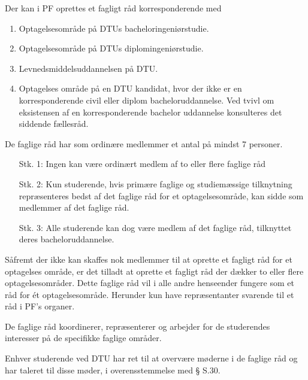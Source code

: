 \begin{list}
\item \label{L4:hvem} Der kan i PF oprettes et fagligt råd korresponderende med
	\begin{enumerate}
	\item Optagelsesområde på DTUs bacheloringeniørstudie.
	\item Optagelsesområde på DTUs diplomingeniørstudie.
	\item Levnedsmiddelsuddannelsen på DTU.
	\item Optagelses område på en DTU kandidat, hvor der ikke er en korresponderende civil eller diplom bacheloruddannelse. Ved tvivl om eksistensen af en korresponderende bachelor uddannelse konsulteres det siddende fællesråd.
	\end{enumerate}     
    
\item \label{L4:ordinaere} De faglige råd har som ordinære medlemmer et antal på mindst 7 personer.
\begin{itemize}%
	\item[Stk. 1:] \label{L4:ordinaere1} Ingen kan være ordinært medlem af to eller flere faglige råd
	
	\item[Stk. 2:] Kun studerende, hvis primære faglige og studiemæssige tilknytning repræsenteres bedst af det faglige råd for et optagelsesområde, kan sidde som medlemmer af det faglige råd.
	
	\item[Stk. 3:] Alle studerende kan dog være medlem af det faglige råd, tilknyttet deres bacheloruddannelse.

\end{itemize}

\item \label{L4:flereraad} Såfremt der ikke kan skaffes nok medlemmer til at oprette et fagligt råd for et optagelses område, er det tilladt at oprette et fagligt råd der dækker to eller flere optagelsesområder. Dette faglige råd vil i alle andre henseender fungere som et råd for ét optagelsesområde. Herunder kun have repræsentanter svarende til et råd i PF’s organer.

\item \label{L4:koordinering} De faglige råd koordinerer, repræsenterer og arbejder for de studerendes interesser på de specifikke faglige områder.

\item Enhver studerende ved DTU har ret til at overvære møderne i de faglige råd og har taleret til disse møder, i overensstemmelse med § S.30.


\end{list}
